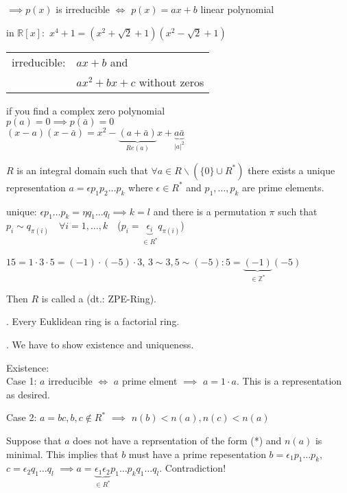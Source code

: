 $\implies p(x)$ is irreducible $\iff$ $p(x) = ax+b$ linear polynomial

in $\mathbb{R}[x]:$
$x^4 + 1 = (x^2 + \sqrt{2} +1)(x^2 - \sqrt{2} + 1)$

\begin{tabular}{ll}
  irreducible:
    & $ax+b$ and \\
    & $ax^2 + bx + c$ without zeros\\
\end{tabular}

if you find a complex zero polynomial \\
$p(a) = 0 \implies p(\bar{a}) = 0$ \\
$(x-a)(x-\bar{a}) = x^2 - \underbrace{(a + \bar{a})}_{Re(a)} x + \underbrace{a\bar{a}}_{|a|^2}$

\begin{definition}
$R$ is an integral domain such that $\forall a \in R \backslash (\{0\} \cup R^{*})$
there exists a unique representation $a = \epsilon p_1 p_2 \ldots p_k$
where $\epsilon \in R^{*}$ and $p_1, \ldots, p_k$ are prime elements.

unique: $\epsilon p_1 \ldots p_k = \eta q_1 \ldots q_l \implies k=l$ and there is a permutation $\pi$ such that
$p_i \sim q_{\pi(i)} \quad \forall i = 1,\ldots, k \quad $($ p_i = \underbrace{\epsilon_i}_{\in R^{*}} q_{\pi(i)} $)

$15 = 1\cdot 3\cdot 5 = (-1) \cdot (-5) \cdot 3$, $ 3 \sim 3, 5 \sim (-5): 5=\underbrace{(-1)}_{\in\mathbb{Z}^{*}} (-5)$

Then $R$ is called a  (dt.: ZPE-Ring).
\end{definition}

\Theorem.
Every Euklidean ring is a factorial ring.

\Proof.
We have to show existence and uniqueness.

Existence:\\
Case 1:
$a$ irreducible $\Leftrightarrow$ $a$ prime elment $\implies$ $a=1\cdot a$. This is a representation as desired.

Case 2: $a= bc, b,c \not\in R^{*}$ $\implies$ $n(b) < n(a), n(c) < n(a)$

Suppose that $a$ does not have a reprsentation of the form (*) and $n(a)$ is minimal.
This implies that $b$ must have a prime repesentation $b = \epsilon_1 p_1 \ldots p_k$, $c = \epsilon_2 q_1 \ldots q_l$
$\implies a = \underbrace{\epsilon_1 \epsilon_2}_{\in R^{*}} p_1 \ldots p_k q_1 \ldots q_l$. Contradiction!

